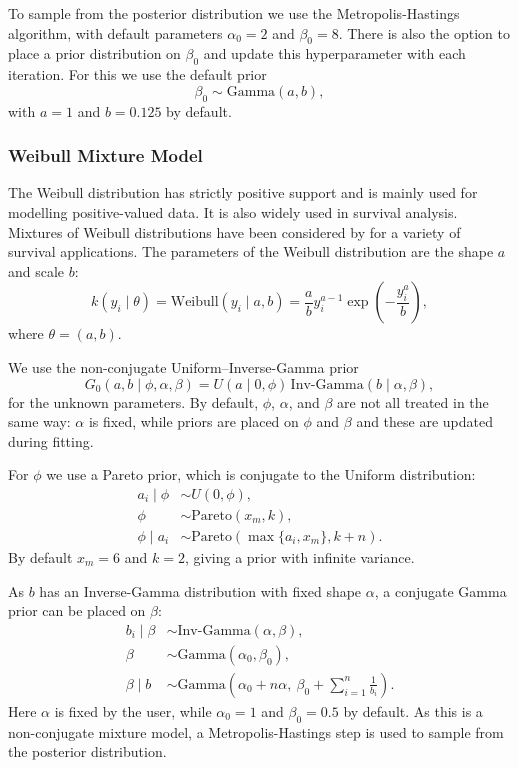 \documentclass[nojss]{jss}
\begin{document}
To sample from the posterior distribution we use the Metropolis-Hastings algorithm, with
default parameters $\alpha_0 = 2$ and $\beta_0 = 8$. There is also the option to place a prior
distribution on $\beta_0$ and update this hyperparameter with each iteration. For this we use the
default prior
\begin{equation*}
\beta_0 \sim \text{Gamma}(a,b),
\end{equation*}
with $a = 1$ and $b = 0.125$ by default.

\subsubsection{Weibull Mixture Model}
The Weibull distribution has strictly positive support and is mainly used for modelling
positive-valued data. It is also widely used in survival analysis. Mixtures of Weibull
distributions have been considered by \citet{kottas_nonparametric_2006} for a variety of
survival applications. The parameters of the Weibull distribution are the shape $a$ and scale $b$:
\begin{equation*}
k(y_i \mid \theta) = \text{Weibull}(y_i \mid a, b) = \frac{a}{b} y_i^{a-1}
\exp \left( -\frac{y_i^a}{b} \right),
\end{equation*}
where $\theta = (a,b)$.

We use the non-conjugate Uniform--Inverse-Gamma prior
\begin{equation*}
G_0(a,b \mid \phi,\alpha,\beta) = U(a \mid 0,\phi)\,\text{Inv-Gamma}(b \mid \alpha,\beta),
\end{equation*}
for the unknown parameters. By default, $\phi$, $\alpha$, and $\beta$ are not all treated in the
same way: $\alpha$ is fixed, while priors are placed on $\phi$ and $\beta$ and these are updated
during fitting.

For $\phi$ we use a Pareto prior, which is conjugate to the Uniform distribution:
\begin{align*}
a_i \mid \phi &\sim U(0,\phi), \\
\phi &\sim \text{Pareto}(x_m, k), \\
\phi \mid a_i &\sim \text{Pareto}(\max\{a_i,x_m\}, k+n).
\end{align*}
By default $x_m = 6$ and $k = 2$, giving a prior with infinite variance.

As $b$ has an Inverse-Gamma distribution with fixed shape $\alpha$, a conjugate Gamma prior
can be placed on $\beta$:
\begin{align*}
b_i \mid \beta &\sim \text{Inv-Gamma}(\alpha,\beta), \\
\beta &\sim \text{Gamma}(\alpha_0,\beta_0), \\
\beta \mid b &\sim \text{Gamma}\left(\alpha_0 + n\alpha,\ \beta_0 + \sum_{i=1}^n \frac{1}{b_i}\right).
\end{align*}
Here $\alpha$ is fixed by the user, while $\alpha_0 = 1$ and $\beta_0 = 0.5$ by default.
As this is a non-conjugate mixture model, a Metropolis-Hastings step is used to sample from
the posterior distribution.
\end{document}
